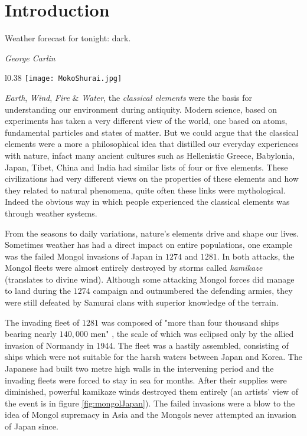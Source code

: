 \chapter{Introduction}\label{chapter:introduction}

\epigraph{Weather forecast for tonight: dark.}{\textit{George Carlin}}

\begin{wrapfigure}{l}{0.38\textwidth}
    \centering\texttt{[image: MokoShurai.jpg]}
    \caption{\small The Mongol fleet destroyed in a typhoon, ink and water on paper, 1847. 
    \textit{Source}: Kikuchi Y\={o}sai / Tokyo National Museum (Public domain)}
    \label{fig:mongolJapan}
\end{wrapfigure}

\emph{Earth}, \emph{Wind}, \emph{Fire} \& \emph{Water}, the \emph{classical elements} were the basis 
for understanding our environment during antiquity. Modern science, based on experiments has taken a very 
different view of the world, one based on atoms, fundamental particles and states of matter. But we could 
argue that the classical elements were a more a philosophical idea that distilled our everyday experiences 
with nature, infact many ancient cultures such as Hellenistic Greece, Babylonia, Japan, Tibet, China and 
India had similar lists of four or five elements. These civilizations had very different views on the 
properties of these elements and how they related to natural phenomena, quite often these links 
were mythological. Indeed the obvious way in which people experienced the classical elements was through
weather systems. 

From the seasons to daily variations, nature's elements drive and shape our lives. Sometimes weather 
has had a direct impact on entire populations, one example was the failed Mongol invasions of Japan 
in $1274$ and $1281$. In both attacks, the Mongol fleets were almost entirely destroyed by storms called 
\emph{kamikaze} (translates to divine wind). Although some attacking Mongol forces did manage to land during 
the $1274$ campaign and outnumbered the defending armies, they were still defeated by Samurai clans with 
superior knowledge of the terrain. 

The invading fleet of $1281$ was composed of "more than four thousand ships bearing nearly $140,000$ men" 
\citep[pg.~17]{mcclain2002japan}, the scale of which was eclipsed only by the allied invasion of Normandy 
in 1944. The fleet was a hastily assembled, consisting of ships which were not suitable for the harsh waters 
between Japan and Korea. The Japanese had built two metre high walls in the intervening period and the invading 
fleets were forced to stay in sea for months. After their supplies were diminished, powerful kamikaze winds 
destroyed them entirely (an artists' view of the event is in figure \ref{fig:mongolJapan}). The failed invasions 
were a blow to the idea of Mongol supremacy in Asia and the Mongols never attempted an invasion of Japan since.

